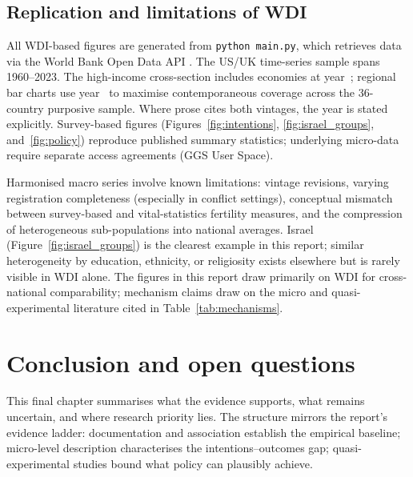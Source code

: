 \documentclass[11pt,a4paper,openany]{book}
\begin{document}
\section{Replication and limitations of WDI}

All WDI-based figures are generated from \texttt{python main.py}, which retrieves data via the World Bank Open Data API \citep{worldbank2024}. The US/UK time-series sample spans 1960--2023. The high-income cross-section includes \SnapshotN{} economies at year~\SnapshotYear{}; regional bar charts use year~\RegionalYear{} to maximise contemporaneous coverage across the 36-country purposive sample. Where prose cites both vintages, the year is stated explicitly. Survey-based figures (Figures~\ref{fig:intentions}, \ref{fig:israel_groups}, and~\ref{fig:policy}) reproduce published summary statistics; underlying micro-data require separate access agreements (GGS User Space).

Harmonised macro series involve known limitations: vintage revisions, varying registration completeness (especially in conflict settings), conceptual mismatch between survey-based and vital-statistics fertility measures, and the compression of heterogeneous sub-populations into national averages. Israel (Figure~\ref{fig:israel_groups}) is the clearest example in this report; similar heterogeneity by education, ethnicity, or religiosity exists elsewhere but is rarely visible in WDI alone. The figures in this report draw primarily on WDI for cross-national comparability; mechanism claims draw on the micro and quasi-experimental literature cited in Table~\ref{tab:mechanisms}.

\FloatBarrier
\chapter{Conclusion and open questions}
\label{ch:conclusion}

This final chapter summarises what the evidence supports, what remains uncertain, and where research priority lies. The structure mirrors the report's evidence ladder: documentation and association establish the empirical baseline; micro-level description characterises the intentions--outcomes gap; quasi-experimental studies bound what policy can plausibly achieve.
\end{document}
